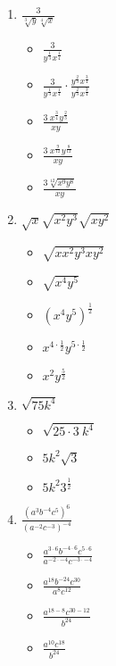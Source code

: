 \documentclass{article}
\begin{document}
\begin{onehalfspace}
\begin{enumerate}[start=69]
        \item $\frac{3}{\sqrt[3]{y} \sqrt[4]{x}}$
        \begin{itemize}
            \item $\frac{3}{y^{\frac{1}{3}} x^{\frac{1}{4}}}$
            \item $\frac{3}{y^{\frac{1}{3}} x^{\frac{1}{4}}} \cdot \frac{y^{\frac{2}{3}} x^{\frac{3}{4}}}{y^{\frac{2}{3}} x^{\frac{3}{4}}}$
            \item $\frac{3 \ x^{\frac{3}{4}} y^{\frac{2}{3}}}{xy}$
            \item $\frac{3 \ x^{\frac{9}{12}} y^{\frac{8}{12}}}{xy}$
            \item $\frac{3 \sqrt[12]{x^{9}y^{8}}}{xy}$
        \end{itemize}

        \item $\sqrt{x} \sqrt{x^{2}y^{3}} \sqrt{xy^{2}}$
        \begin{itemize}
            \item $\sqrt{xx^{2}y^{3}xy^{2}}$
            \item $\sqrt{x^{4}y^{5}}$
            \item $(x^{4}y^{5})^{\frac{1}{2}}$
            \item $x^{4 \cdot \frac{1}{2}}y^{5 \cdot \frac{1}{2}}$
            \item $x^{2}y^{\frac{5}{2}}$
        \end{itemize}

        \item $\sqrt{75k^{4}}$
        \begin{itemize}
            \item $\sqrt{25 \cdot 3 \ k^{4}}$
            \item $5k^{2}\sqrt{3}$
            \item $5k^{2}3^{\frac{1}{2}}$
        \end{itemize}

        \item $\frac{(a^{3} b^{-4} c^{5})^{6}}{(a^{-2} c^{-3})^{-4}}$
        \begin{itemize}
            \item $\frac{a^{3 \cdot 6} b^{-4 \cdot 6} c^{5 \cdot 6}}{a^{-2 \cdot -4} c^{-3 \cdot -4}}$
            \item $\frac{a^{18} b^{-24} c^{30}}{a^{8} c^{12}}$
            \item $\frac{a^{18 - 8} c^{30 - 12}}{b^{24}}$
            \item $\frac{a^{10} c^{18}}{b^{24}}$
        \end{itemize}


\end{enumerate}
\end{onehalfspace}
\end{document}
